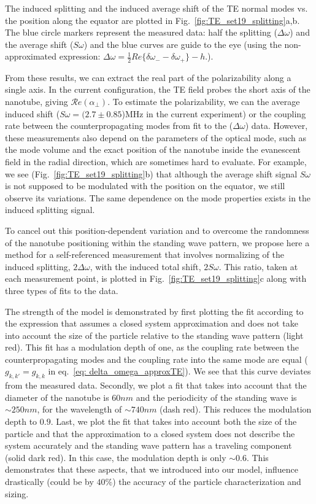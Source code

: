 \documentclass[journal=jacsat,manuscript=article]{achemso}
\begin{document}
The induced splitting and the induced average shift of the TE normal modes vs. the position along the equator are plotted in Fig.~\ref{fig:TE_set19_splitting}a,b. The blue circle markers represent the measured data: half the splitting ($\Delta \omega$) and the average shift ($\textit{S} \omega$) and the blue curves are guide to the eye (using the non-approximated expression: $\Delta\omega = \frac{1}{2}Re\{\delta\omega_- -\delta\omega_+\}-h$.).

From these results, we can extract the real part of the polarizability along a single axis. In the current configuration, the TE field probes the short axis of the nanotube, giving $\mathcal{R}e(\alpha_{\perp})$. To estimate the polarizability, we can the average induced shift ($S\omega = (2.7 \pm 0.85$)MHz in the current experiment) or the coupling rate between the counterpropagating modes from fit to the ($\Delta \omega$) data. However, these measurements also depend on the parameters of the optical mode, such as the mode volume and the exact position of the nanotube inside the evanescent field in the radial direction, which are sometimes hard to evaluate. For example, we see (Fig.~\ref{fig:TE_set19_splitting}b) that although the average shift signal $S\omega$ is not supposed to be modulated with the position on the equator, we still observe its variations. The same dependence on the mode properties exists in the induced splitting signal.

To cancel out this position-dependent variation and to overcome the randomness of the nanotube positioning within the standing wave pattern, we propose here a method for a self-referenced measurement that involves normalizing of the induced splitting, $2\Delta\omega$, with the induced total shift, $2S\omega$. This ratio, taken at each measurement point, is plotted in Fig.~\ref{fig:TE_set19_splitting}c along with three types of fits to the data.

The strength of the model is demonstrated by first plotting the fit according to the expression that assumes a closed system approximation and does not take into account the size of the particle relative to the standing wave pattern (light red). This fit has a modulation depth of one, as the coupling rate between the counterpropagating modes and the coupling rate into the same mode are equal ($g_{k,k'}=g_{k,k}$ in eq.~\ref{eq: delta_omega_approxTE}). We see that this curve deviates from the measured data. Secondly, we plot a fit that takes into account that the diameter of the nanotube is $60nm$ and the periodicity of the standing wave is $\sim 250nm$, for the wavelength of $\sim740nm$ (dash red). This reduces the modulation depth to $0.9$. Last, we plot the fit that takes into account both the size of the particle and that the approximation to a closed system does not describe the system accurately and the standing wave pattern has a traveling component (solid dark red). In this case, the modulation depth is only $\sim0.6$. This demonstrates that these aspects, that we introduced into our model, influence drastically (could be by $40\%$) the accuracy of the particle characterization and sizing.
\end{document}
